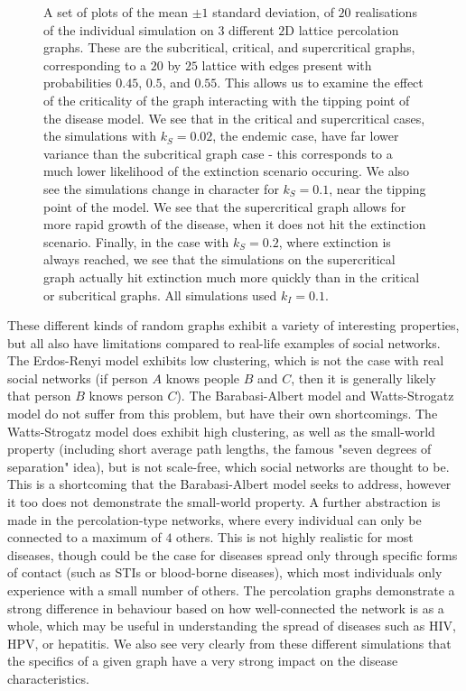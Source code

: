 \documentclass[12pt,a4paper,openany,twoside]{book}
\begin{document}
\begin{figure}[H]
	\caption{A set of plots of the mean $\pm 1$ standard deviation, of $20$ realisations of the individual simulation on $3$ different $2$D lattice percolation graphs. These are the subcritical, critical, and supercritical graphs, corresponding to a $20$ by $25$ lattice with edges present with probabilities $0.45$, $0.5$, and $0.55$. This allows us to examine the effect of the criticality of the graph interacting with the tipping point of the disease model. We see that in the critical and supercritical cases, the simulations with $k_S = 0.02$, the endemic case, have far lower variance than the subcritical graph case - this corresponds to a much lower likelihood of the extinction scenario occuring. We also see the simulations change in character for $k_S = 0.1$, near the tipping point of the model. We see that the supercritical graph allows for more rapid growth of the disease, when it does not hit the extinction scenario. Finally, in the case with $k_S = 0.2$, where extinction is always reached, we see that the simulations on the supercritical graph actually hit extinction much more quickly than in the critical or subcritical graphs. All simulations used $k_I = 0.1$.}
	\label{figs:SISindvperc}
\end{figure}

These different kinds of random graphs exhibit a variety of interesting properties, but all also have limitations compared to real-life examples of social networks. The Erdos-Renyi model exhibits low clustering, which is not the case with real social networks (if person $A$ knows people $B$ and $C$, then it is generally likely that person $B$ knows person $C$). The Barabasi-Albert model and Watts-Strogatz model do not suffer from this problem, but have their own shortcomings. The Watts-Strogatz model does exhibit high clustering, as well as the small-world property (including short average path lengths, the famous "seven degrees of separation" idea), but is not scale-free, which social networks are thought to be. This is a shortcoming that the Barabasi-Albert model seeks to address, however it too does not demonstrate the small-world property. A further abstraction is made in the percolation-type networks, where every individual can only be connected to a maximum of $4$ others. This is not highly realistic for most diseases, though could be the case for diseases spread only through specific forms of contact (such as STIs or blood-borne diseases), which most individuals only experience with a small number of others. The percolation graphs demonstrate a strong difference in behaviour based on how well-connected the network is as a whole, which may be useful in understanding the spread of diseases such as HIV, HPV, or hepatitis. We also see very clearly from these different simulations that the specifics of a given graph have a very strong impact on the disease characteristics.
\end{document}
